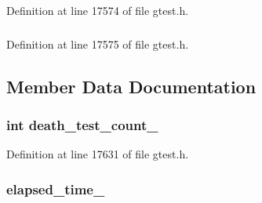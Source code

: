 \-Definition at line 17574 of file gtest.\-h.

\hypertarget{classtesting_1_1TestResult_aaeb07ea6ba11473f5b2ff2067a1d734a}{
\subsubsection[{\-Unit\-Test}]{}}\label{d6/d6e/classtesting_1_1TestResult_aaeb07ea6ba11473f5b2ff2067a1d734a}


\-Definition at line 17575 of file gtest.\-h.



\subsection{\-Member \-Data \-Documentation}
\hypertarget{classtesting_1_1TestResult_aa8b0cbfd87e7104bed9e7713972d0f8f}{
\subsubsection[{death\-\_\-test\-\_\-count\-\_\-}]{\setlength{\rightskip}{0pt plus 5cm}int {\bf death\-\_\-test\-\_\-count\-\_\-}}}\label{d6/d6e/classtesting_1_1TestResult_aa8b0cbfd87e7104bed9e7713972d0f8f}


\-Definition at line 17631 of file gtest.\-h.

\hypertarget{classtesting_1_1TestResult_a97b9c166ebee95ae4c9ef26cf3155617}{
\subsubsection[{elapsed\-\_\-time\-\_\-}]{ {\bf elapsed\-\_\-time\-\_\-}}}\label{d6/d6e/classtesting_1_1TestResult_a97b9c166ebee95ae4c9ef26cf3155617}


